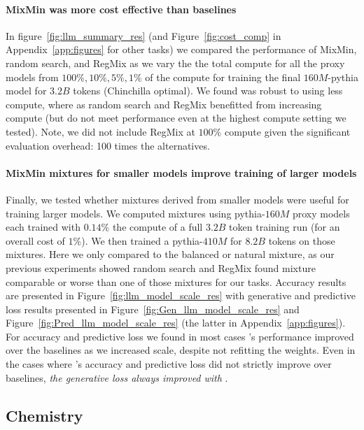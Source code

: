 \paragraph{MixMin was more cost effective than baselines} In figure~\ref{fig:llm_summary_res} (and Figure~\ref{fig:cost_comp} in Appendix~\ref{app:figures} for other tasks) we compared the performance of MixMin, random search, and RegMix as we vary the the total compute for all the proxy models from $100\%,10\%,5\%,1\%$ of the compute for training the final $160M$-pythia model for $3.2B$ tokens (Chinchilla optimal). We found \method was robust to using less compute, where as random search and RegMix benefitted from increasing compute (but do not meet \method performance even at the highest compute setting we tested). Note, we did not include RegMix at $100\%$ compute given the significant evaluation overhead: 100 times the alternatives.


\paragraph{MixMin mixtures for smaller models improve training of larger models} Finally, we tested whether \method mixtures derived from smaller models were useful for training larger models. We computed \method mixtures using pythia-$160M$ proxy models each trained with $0.14\%$ the compute of a full $3.2B$ token training run (for an overall cost of $1\%$). We then trained a pythia-$410M$ for $8.2B$ tokens on those mixtures. Here we only compared to the balanced or natural mixture, as our previous experiments showed random search and RegMix found mixture comparable or worse than one of those mixtures for our tasks. Accuracy results are presented in Figure~\ref{fig:llm_model_scale_res} with generative and predictive loss results presented in Figure~\ref{fig:Gen_llm_model_scale_res} and Figure~\ref{fig:Pred_llm_model_scale_res} (the latter in Appendix~\ref{app:figures}). For accuracy and predictive loss we found in most cases \methodnospace's performance improved over the baselines as we increased scale, despite not refitting the \method weights. Even in the cases where \methodnospace's accuracy and predictive loss did not strictly improve over baselines, \emph{the generative loss always improved with \methodnospace}. 







\subsection{Chemistry}


